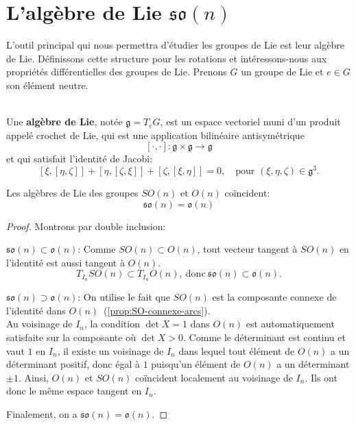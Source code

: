 \documentclass[12pt]{report}
\begin{document}
\section{L'algèbre de Lie \texorpdfstring{$\mathfrak{so}(n)$}{so (n)}}

L'outil principal qui nous permettra d'étudier les groupes de Lie est leur algèbre de Lie. Définissons cette structure pour les rotations et intéressons-nous aux propriétés différentielles des groupes de Lie. Prenons $G$ un groupe de Lie et $e\in G$ son élément neutre.

\begin{definition} \leavevmode\\
Une \textbf{algèbre de Lie}, notée $\mathfrak{g} = T_{e}G$, est un espace vectoriel muni d'un produit appelé crochet de Lie, qui est une application bilinéaire antisymétrique~\cite{Hol24}
\[
[\cdot,\cdot] : \mathfrak{g} \times \mathfrak{g} \to \mathfrak{g}
\]
et qui satisfait l'identité de Jacobi:
\[
[\xi,[\eta, \zeta]] + [\eta,[\zeta, \xi]] + [\zeta,[\xi, \eta]] = 0, \quad \text{pour } (\xi,\eta,\zeta) \in \mathfrak{g}^3.
\]
\end{definition}

\begin{proposition}\label{prop:so(n)=o(n)}
Les algèbres de Lie des groupes $SO(n)$ et $O(n)$ coïncident:
\[
\mathfrak{so}(n)=\mathfrak{o}(n)
\]
\end{proposition}

\begin{proof}
Montrons par double inclusion:

$\mathfrak{so}(n)\subset \mathfrak{o}(n)$: Comme $SO(n)\subset O(n)$, tout vecteur tangent à $SO(n)$ en l'identité est aussi tangent à $O(n)$.
\[
T_{I_n}SO(n)\subset T_{I_n}O(n),~\text{donc}~\mathfrak{so}(n)\subset \mathfrak{o}(n).
\]

$\mathfrak{so}(n)\supset \mathfrak{o}(n)$: On utilise le fait que $SO(n)$ est la composante connexe de l'identité dans $O(n)$~(\ref{prop:SO-connexe-arcs}).\\
Au voisinage de $I_n$, la condition $\det X=1$ dans $O(n)$ est automatiquement satisfaite sur la composante où $\det X>0$. Comme le déterminant est continu et vaut $1$ en $I_n$, il existe un voisinage de $I_n$ dans lequel tout élément de $O(n)$ a un déterminant positif, donc égal à $1$ puisqu'un élément de $O(n)$ a un déterminant $\pm 1$. Ainsi, $O(n)$ et $SO(n)$ coïncident localement au voisinage de $I_n$. Ils ont donc le même espace tangent en $I_n$.

Finalement, on a \underline{$\mathfrak{so}(n)=\mathfrak{o}(n)$}.
\end{proof}
\end{document}
